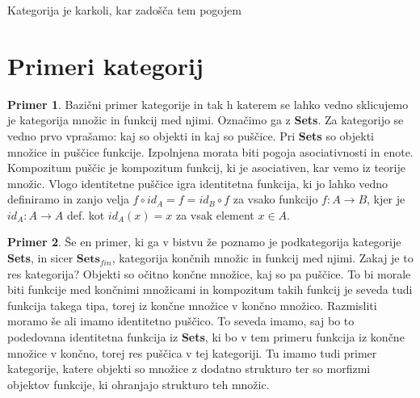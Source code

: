 \documentclass[12pt,a4paper]{book}
\theoremstyle{definition}
\theoremstyle{plain}
\theoremstyle{definition}
\newtheorem{primer}{Primer}[section]
\theoremstyle{remark}
\begin{document}
Kategorija je karkoli, kar zadošča tem pogojem

\section{Primeri kategorij}

\begin{primer}
Bazični primer kategorije in tak h katerem se lahko vedno sklicujemo je kategorija množic in funkcij med njimi. Označimo ga z \textbf{Sets}. Za kategorijo se vedno prvo vprašamo: kaj so objekti in kaj so puščice. Pri \textbf{Sets} so objekti množice in puščice funkcije.
Izpolnjena morata biti pogoja asociativnosti in enote.
Kompozitum puščic je kompozitum funkcij, ki je asociativen, kar vemo iz teorije množic.
Vlogo identitetne puščice igra identitetna funkcija, ki jo lahko vedno definiramo in zanjo velja $f \circ id_A = f = id_B \circ f$ za vsako funkcijo $f : A \to B$, kjer je $id_A : A \to A$ def. kot $id_A(x) = x$ za vsak element $x \in A$.
\end{primer}

\begin{primer}
Še en primer, ki ga v bistvu že poznamo je podkategorija kategorije \textbf{Sets}, in sicer $\textbf{Sets}_{fin}$, kategorija končnih množic in funkcij med njimi. Zakaj je to res kategorija? Objekti so očitno končne množice, kaj so pa puščice. To bi morale biti funkcije med končnimi množicami in kompozitum takih funkcij je seveda tudi funkcija takega tipa, torej iz končne množice v končno množico. Razmisliti moramo še ali imamo identitetno puščico. To seveda imamo, saj bo to podedovana identitetna funkcija iz \textbf{Sets}, ki bo v tem primeru funkcija iz končne množice v končno, torej res puščica v tej kategoriji. Tu imamo tudi primer kategorije, katere objekti so množice z dodatno strukturo ter so morfizmi objektov funkcije, ki ohranjajo strukturo teh množic.
\end{primer}
\end{document}
